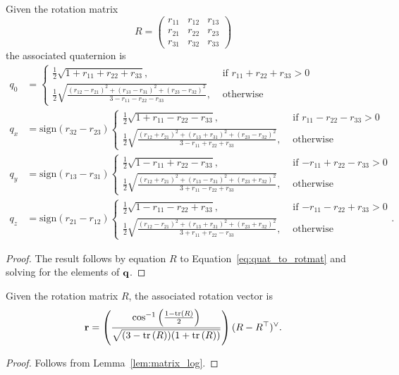 \begin{lemma} \label{lem:rotmat_to_quaternion}
Given the rotation matrix 
\[
R = \begin{pmatrix} 
	r_{11} &  r_{12} &  r_{13} \\ 		
	r_{21} &  r_{22} &  r_{23} \\ 		
	r_{31} &  r_{32} &  r_{33}		
 \end{pmatrix}
\]
the associated quaternion is~\cite{SarabandiThomas18}
\begin{align*}
q_0 &= \begin{cases}
 \frac{1}{2}\sqrt{1+r_{11}+r_{22}+r_{33}}, & \text{~if~$r_{11}+r_{22}+r_{33}>0$} \\
 \frac{1}{2}\sqrt{\frac{(r_{12}-r_{21})^2+(r_{13}-r_{31})^2+(r_{23}-r_{32})^2}{3-r_{11}-r_{22}-r_{33}}}, & \text{~otherwise}	
 \end{cases} \\
q_x &= \text{sign}(r_{32}-r_{23})\begin{cases}
 \frac{1}{2}\sqrt{1+r_{11}-r_{22}-r_{33}}, & \text{~if~$r_{11}-r_{22}-r_{33}>0$} \\
 \frac{1}{2}\sqrt{\frac{(r_{12}+r_{21})^2+(r_{13}+r_{31})^2+(r_{23}-r_{32})^2}{3-r_{11}+r_{22}+r_{33}}}, & \text{~otherwise}	
 \end{cases} \\
q_y &= \text{sign}(r_{13}-r_{31})\begin{cases}
 \frac{1}{2}\sqrt{1-r_{11}+r_{22}-r_{33}}, & \text{~if~$-r_{11}+r_{22}-r_{33}>0$} \\
 \frac{1}{2}\sqrt{\frac{(r_{12}+r_{21})^2+(r_{13}-r_{31})^2+(r_{23}+r_{32})^2}{3+r_{11}-r_{22}+r_{33}}}, & \text{~otherwise}	
 \end{cases} \\
q_z &= \text{sign}(r_{21}-r_{12})\begin{cases}
 \frac{1}{2}\sqrt{1-r_{11}-r_{22}+r_{33}}, & \text{~if~$-r_{11}-r_{22}+r_{33}>0$} \\
 \frac{1}{2}\sqrt{\frac{(r_{12}-r_{21})^2+(r_{13}+r_{31})^2+(r_{23}+r_{32})^2}{3+r_{11}+r_{22}-r_{33}}}, & \text{~otherwise}	
 \end{cases}.
\end{align*}
\end{lemma}
\begin{proof}
The result follows by equation $R$ to Equation~\eqref{eq:quat_to_rotmat} and solving for the elements of $\mathbf{q}$.
\end{proof}

\begin{lemma} \label{lem:rotmat_to_rotvec}
Given the rotation matrix $R$, the associated rotation vector is
\[
\mathbf{r} = \left(\frac{\cos^{-1}\left(\frac{1-\text{tr}\left(R\right)}{2}\right)}{\sqrt{(3-\text{tr}\left(R\right))(1+\text{tr}\left(R\right))}}\right)(R-R^\top)^\vee.
\]
\end{lemma}
\begin{proof}
Follows from Lemma~\ref{lem:matrix_log}.
\end{proof}

